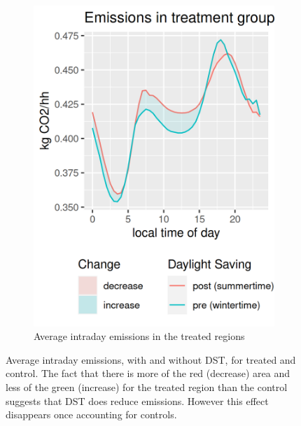 \begin{figure}[ht]
\begin{subfigure}[t]{0.45\textwidth}
        \includegraphics[width=\textwidth]{Images/intraday/co2_kg_per_capita/by-treated/treatment/hr_local-filled.png}
        \caption{Average intraday emissions in the treated regions} %
        \label{fig:intraday co2 treated}
    \end{subfigure}
    \caption[Average intraday emissions, with and without \acs{DST}, for treated and control]{Average intraday emissions, with and without \acs{DST}, for treated and control. The fact that there is more of the red (decrease) area and less of the green (increase) for the treated region than the control suggests that \acs{DST} does reduce emissions. However this effect disappears once accounting for controls.} 
    \label{fig:intraday co2}
\end{figure}


